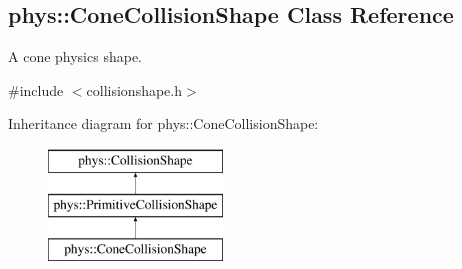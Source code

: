 \hypertarget{classphys_1_1ConeCollisionShape}{
\subsection{phys::ConeCollisionShape Class Reference}
\label{classphys_1_1ConeCollisionShape}
}


A cone physics shape.  




{\ttfamily \#include $<$collisionshape.h$>$}

Inheritance diagram for phys::ConeCollisionShape:\begin{figure}[H]
\begin{center}
\leavevmode
\includegraphics[height=3.000000cm]{classphys_1_1ConeCollisionShape}
\end{center}
\end{figure}
